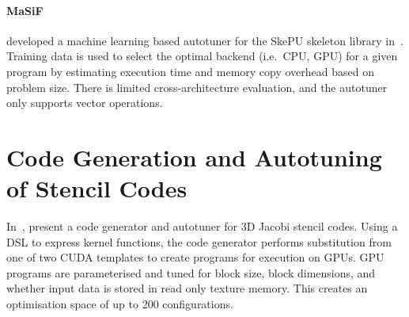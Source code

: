 %
\paragraph{MaSiF} 


\citeauthor{Dastgeer2011} developed a machine learning based autotuner
for the SkePU skeleton library in~\cite{Dastgeer2011}. Training data
is used to select the optimal backend (i.e.\ CPU, GPU) for a given
program by estimating execution time and memory copy overhead based on
problem size. There is limited cross-architecture evaluation, and the
autotuner only supports vector operations.



\section{Code Generation and Autotuning of Stencil Codes}

In~\cite{Zhang2013a}, \citeauthor{Zhang2013a} present a code generator
and autotuner for 3D Jacobi stencil codes. Using a DSL to express
kernel functions, the code generator performs substitution from one of
two CUDA templates to create programs for execution on GPUs. GPU
programs are parameterised and tuned for block size, block dimensions,
and whether input data is stored in read only texture memory. This
creates an optimisation space of up to 200 configurations.


